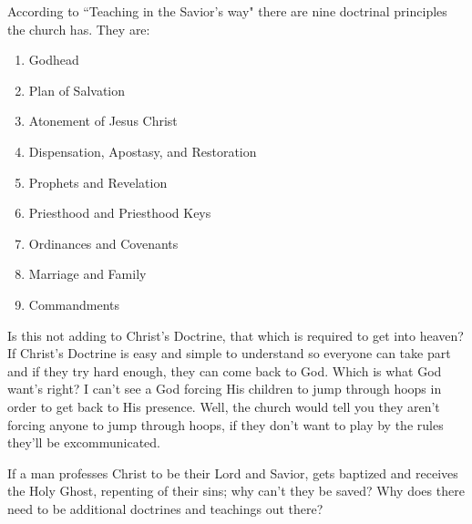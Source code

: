According to ``Teaching in the Savior's way" there are nine doctrinal principles the
church has. They are:

\begin{enumerate}
  \item Godhead
  \item Plan of Salvation
  \item Atonement of Jesus Christ
  \item Dispensation, Apostasy, and Restoration
  \item Prophets and Revelation
  \item Priesthood and Priesthood Keys
  \item Ordinances and Covenants
  \item Marriage and Family
  \item Commandments
\end{enumerate}

Is this not adding to Christ's Doctrine, that which is required to get into heaven?
If Christ's Doctrine is easy and simple to understand so everyone can take part and
if they try hard enough, they can come back to God. Which is what God want's right? I
can't see a God forcing His children to jump through hoops in order to get back to
His presence. Well, the church would tell you they aren't forcing anyone to jump
through hoops, if they don't want to play by the rules they'll be excommunicated.

If a man professes Christ to be their Lord and Savior, gets baptized and receives the
Holy Ghost, repenting of their sins; why can't they be saved? Why does there need to
be additional doctrines and teachings out there?
